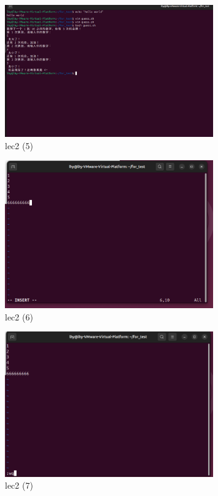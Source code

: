 \documentclass[a4paper, 12pt]{article}
\begin{document}
\begin{figure}[htbp]
    \centering
    \includegraphics[width=0.8\textwidth]{lec2 (5).png}
    \caption{lec2 (5)}
    \label{fig:lec2-5}
\end{figure}

\begin{figure}[htbp]
    \centering
    \includegraphics[width=0.8\textwidth]{lec2 (6).png}
    \caption{lec2 (6)}
    \label{fig:lec2-6}
\end{figure}

\begin{figure}[htbp]
    \centering
    \includegraphics[width=0.8\textwidth]{lec2 (7).png}
    \caption{lec2 (7)}
    \label{fig:lec2-7}
\end{figure}
\newpage
\end{document}
